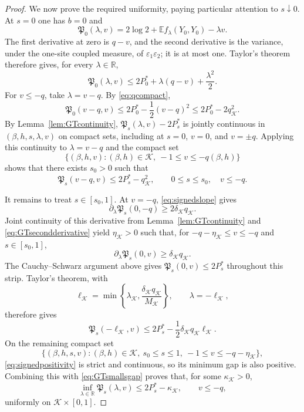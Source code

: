 \documentclass[11pt]{article}
\numberwithin{equation}{section}
\theoremstyle{plain}
\theoremstyle{definition}
\newcommand{\E}{\mathbb E}
\newcommand{\1}{\mathbf 1}
\newcommand{\cK}{\mathcal K}
\begin{document}
\begin{proof}
We now prove the required uniformity, paying particular attention to
$s\downarrow0$.  At $s=0$ one has $b=0$ and
\[
 \mathfrak P_0(\lambda,v)
 =2\log2+\E f_\lambda(Y_0,Y_0)-\lambda v.
\]
The first derivative at zero is $q-v$, and the second derivative is
the variance, under the one-site coupled measure, of
$\varepsilon_1\varepsilon_2$; it is at most one.  Taylor's theorem
therefore gives, for every $\lambda\in\mathbb R$,
\begin{equation}
 \mathfrak P_0(\lambda,v)
 \le2P_0^*+\lambda(q-v)+\frac{\lambda^2}{2}.
 \label{eq:GTendpoint}
\end{equation}
For $v\le-q$, take $\lambda=v-q$.  By \eqref{eq:qcompact},
\begin{equation}
 \mathfrak P_0(v-q,v)
 \le2P_0^*-\frac12(v-q)^2
 \le2P_0^*-2q_{\cK}^2.
 \label{eq:GTsmallsgapzero}
\end{equation}
By Lemma~\ref{lem:GTcontinuity},
$\mathfrak P_s(\lambda,v)-2P_s^*$ is jointly continuous in
$(\beta,h,s,\lambda,v)$ on compact sets, including at $s=0$, $v=0$,
and $v=\pm q$.  Applying this continuity to
$\lambda=v-q$ and the compact set
\[
 \{(\beta,h,v):(\beta,h)\in\cK,\ -1\le v\le-q(\beta,h)\}
\]
shows that there exists $s_0>0$ such that
\begin{equation}
 \mathfrak P_s(v-q,v)\le2P_s^*-q_{\cK}^2,
 \qquad 0\le s\le s_0,\quad v\le-q.
 \label{eq:GTsmallsgap}
\end{equation}

It remains to treat $s\in[s_0,1]$.  At $v=-q$,
\eqref{eq:signedslope} gives
\[
 \partial_\lambda\mathfrak P_s(0,-q)
 \ge2\delta_{\cK}q_{\cK}.
\]
Joint continuity of this derivative from Lemma~\ref{lem:GTcontinuity} and
\eqref{eq:GTsecondderivative} yield $\eta_{\cK}>0$ such that, for
$-q-\eta_{\cK}\le v\le-q$ and $s\in[s_0,1]$,
\[
 \partial_\lambda\mathfrak P_s(0,v)
 \ge\delta_{\cK}q_{\cK}.
\]
The Cauchy--Schwarz argument above gives
$\mathfrak P_s(0,v)\le2P_s^*$ throughout this strip.  Taylor's theorem,
with
\[
 \ell_{\cK}=\min\left\{\lambda_{\cK},
 \frac{\delta_{\cK}q_{\cK}}{M_{\cK}}\right\},
 \qquad\lambda=-\ell_{\cK},
\]
therefore gives
\[
 \mathfrak P_s(-\ell_{\cK},v)
 \le2P_s^*-\frac12\delta_{\cK}q_{\cK}\ell_{\cK}.
\]
On the remaining compact set
\[
 \{(\beta,h,s,v):(\beta,h)\in\cK,\ s_0\le s\le1,\
                 -1\le v\le-q-\eta_{\cK}\},
\]
\eqref{eq:signedpositivity} is strict and continuous, so its minimum
gap is also positive.  Combining this with
\eqref{eq:GTsmallsgap} proves that, for some
$\kappa_{\cK}>0$,
\begin{equation}
 \inf_{\lambda\in\mathbb R}\mathfrak P_s(\lambda,v)
 \le2P_s^*-\kappa_{\cK},\qquad v\le-q,
 \label{eq:GTuniformnegativegap}
\end{equation}
uniformly on $\cK\times[0,1]$.


\end{proof}
\end{document}
